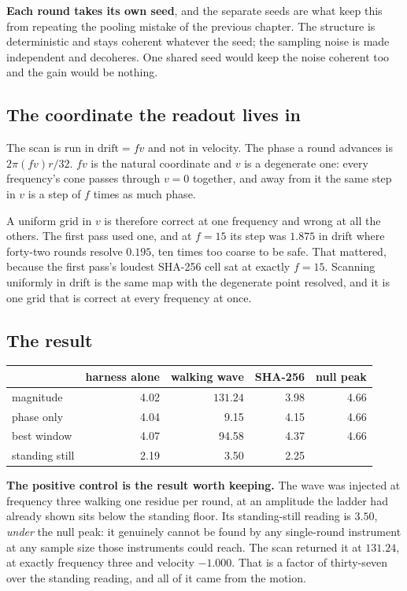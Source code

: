 \textbf{Each round takes its own seed}, and the separate seeds are what keep this from repeating the
pooling mistake of the previous chapter. The structure is deterministic and stays coherent whatever
the seed; the sampling noise is made independent and decoheres. One shared seed would keep the
noise coherent too and the gain would be nothing.

\subsection{The coordinate the readout lives in}

The scan is run in \(\text{drift} = f v\) and not in velocity. The phase a round advances is
\(2 \pi (f v) r / 32\). \(fv\) is the natural coordinate and \(v\) is a degenerate one: every
frequency's cone passes through \(v = 0\) together, and away from it the same step in \(v\) is a
step of \(f\) times as much phase.

A uniform grid in \(v\) is therefore correct at one frequency and wrong at all the others. The
first pass used one, and at \(f = 15\) its step was \(1.875\) in drift where forty-two rounds
resolve \(0.195\), ten times too coarse to be safe. That mattered, because the first pass's
loudest SHA-256 cell sat at exactly \(f = 15\). Scanning uniformly in drift is the same map with
the degenerate point resolved, and it is one grid that is correct at every frequency at once.

\subsection{The result}

\begin{center}
\begin{tabular}{lrrrr}
\toprule
 & harness alone & walking wave & SHA-256 & null peak \\
\midrule
magnitude & 4.02 & \(\mathbf{131.24}\) & 3.98 & 4.66 \\
phase only & 4.04 & 9.15 & 4.15 & 4.66 \\
best window & 4.07 & 94.58 & 4.37 & 4.66 \\
standing still & 2.19 & 3.50 & 2.25 & \textemdash{} \\
\bottomrule
\end{tabular}
\end{center}

\textbf{The positive control is the result worth keeping.} The wave was injected at frequency three
walking one residue per round, at an amplitude the ladder had already shown sits below the standing
floor. Its standing-still reading is \(3.50\), \emph{under} the null peak: it genuinely cannot be
found by any single-round instrument at any sample size those instruments could reach. The scan
returned it at \(131.24\), at exactly frequency three and velocity \(-1.000\). That is a factor of
thirty-seven over the standing reading, and all of it came from the motion.

